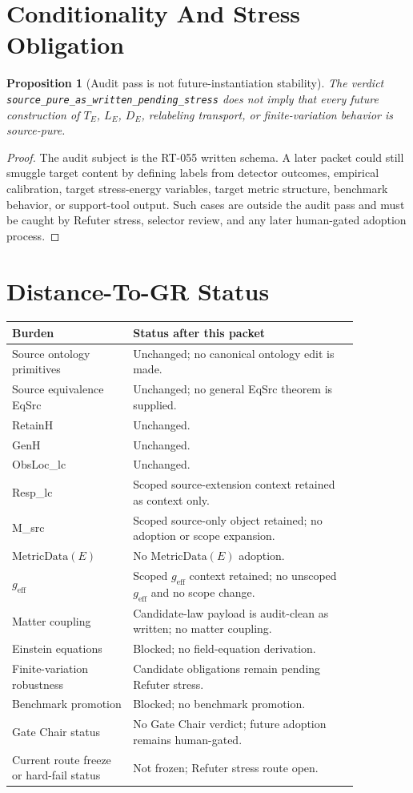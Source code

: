 \documentclass[11pt]{article}
\newcommand{\MetricData}{\mathrm{MetricData}}
\newcommand{\geff}{g_{\mathrm{eff}}}
\newtheorem{proposition}{Proposition}
\begin{document}
\section{Conditionality And Stress Obligation}

\begin{proposition}[Audit pass is not future-instantiation stability]
The verdict \texttt{source\_pure\_as\_written\_pending\_stress} does not imply
that every future construction of \(T_E\), \(L_E\), \(D_E\), relabeling
transport, or finite-variation behavior is source-pure.
\end{proposition}

\begin{proof}
The audit subject is the RT-055 written schema.  A later packet could still
smuggle target content by defining labels from detector outcomes, empirical
calibration, target stress-energy variables, target metric structure,
benchmark behavior, or support-tool output.  Such cases are outside the audit
pass and must be caught by Refuter stress, selector review, and any later
human-gated adoption process.
\end{proof}

\section{Distance-To-GR Status}

\begin{longtable}{p{0.30\linewidth}p{0.56\linewidth}}
\toprule
Burden & Status after this packet \\
\midrule
Source ontology primitives & Unchanged; no canonical ontology edit is made. \\
Source equivalence EqSrc & Unchanged; no general EqSrc theorem is supplied. \\
RetainH & Unchanged. \\
GenH & Unchanged. \\
ObsLoc\_lc & Unchanged. \\
Resp\_lc & Scoped source-extension context retained as context only. \\
M\_src & Scoped source-only object retained; no adoption or scope expansion. \\
\(\MetricData(E)\) & No \(\MetricData(E)\) adoption. \\
\(\geff\) & Scoped \(\geff\) context retained; no unscoped \(\geff\) and no scope change. \\
Matter coupling & Candidate-law payload is audit-clean as written; no matter coupling. \\
Einstein equations & Blocked; no field-equation derivation. \\
Finite-variation robustness & Candidate obligations remain pending Refuter stress. \\
Benchmark promotion & Blocked; no benchmark promotion. \\
Gate Chair status & No Gate Chair verdict; future adoption remains human-gated. \\
Current route freeze or hard-fail status & Not frozen; Refuter stress route open. \\
\bottomrule
\end{longtable}
\end{document}
